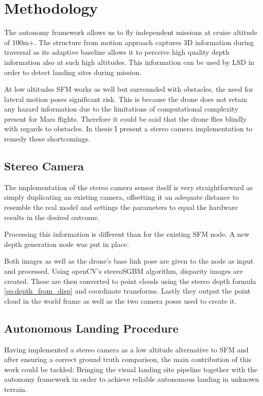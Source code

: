 \chapter{Methodology}
\label{sec:methodology}

The autonomy framework\citep{Autonomy} allows us to fly independent missions at cruise altitude of 100m+. The structure from motion approach captures 3D information during traversal as its adaptive baseline allows it to perceive high quality depth information also at such high altitudes. This information can be used by LSD in order to detect landing sites during mission. 

At low altitudes SFM works as well but surrounded with obstacles, the need for lateral motion poses significant risk. This is because the drone does not retain any hazard information due to the limitations of computational complexity present for Mars flights. Therefore it could be said that the drone flies blindly with regards to obstacles. In thesis I present a stereo camera implementation to remedy these shortcomings.

\section{Stereo Camera}

The implementation of the stereo camera sensor itself is very straightforward as simply duplicating an existing camera, offsetting it an adequate distance to resemble the real model and settings the parameters to equal the hardware results in the desired outcome.

Processing this information is different than for the existing SFM node. A new depth generation node was put in place. 

Both images as well as the drone's base link pose are given to the node as input and processed. Using openCV's stereoSGBM algorithm, disparity images are created. These are then converted to point clouds using the stereo depth formula \ref{eq:depth_from_disp} and coordinate transforms. Lastly they output the point cloud in the world frame as well as the two camera poses used to create it.

\section{Autonomous Landing Procedure}

Having implemented a stereo camera as a low altitude alternative to SFM and after ensuring a correct ground truth comparison, the main contribution of this work could be tackled: Bringing the visual landing site pipeline together with the autonomy framework in order to achieve reliable autonomous landing in unknown terrain.

